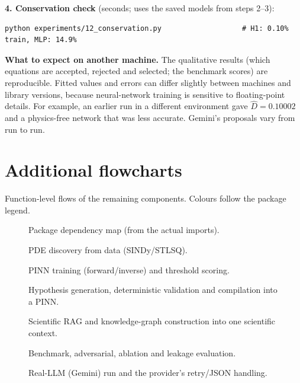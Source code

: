 \documentclass[11pt,a4paper]{article}
\begin{document}
\textbf{4. Conservation check} (seconds; uses the saved models from steps 2--3):
{\footnotesize\begin{verbatim}
python experiments/12_conservation.py                   # H1: 0.10% train, MLP: 14.9%
\end{verbatim}}

\textbf{What to expect on another machine.} The qualitative results (which equations are accepted, rejected and
selected; the benchmark scores) are reproducible. Fitted values and errors can differ slightly between machines and
library versions, because neural-network training is sensitive to floating-point details. For example, an earlier
run in a different environment gave $\hat D=0.10002$ and a physics-free network that was less accurate. Gemini's
proposals vary from run to run.

\appendix
\section{Additional flowcharts}
Function-level flows of the remaining components. Colours follow the package legend.

\begin{figure}[!htb]\centering
\caption{Package dependency map (from the actual imports).}\end{figure}

\begin{figure}[!htb]\centering\pkglegend
\caption{PDE discovery from data (SINDy/STLSQ).}\end{figure}

\begin{figure}[!htb]\centering\pkglegend
\caption{PINN training (forward/inverse) and threshold scoring.}\end{figure}

\begin{figure}[!htb]\centering\pkglegend
\caption{Hypothesis generation, deterministic validation and compilation into a PINN.}\end{figure}

\begin{figure}[!htb]\centering\pkglegend
\caption{Scientific RAG and knowledge-graph construction into one scientific context.}\end{figure}

\begin{figure}[!htb]\centering\pkglegend
\caption{Benchmark, adversarial, ablation and leakage evaluation.}\end{figure}

\begin{figure}[!htb]\centering\pkglegend
\caption{Real-LLM (Gemini) run and the provider's retry/JSON handling.}\end{figure}
\end{document}
